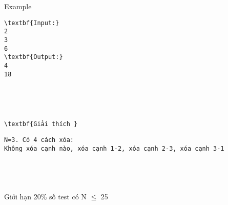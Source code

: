 Example
\begin{verbatim}
\textbf{Input:}
2
3
6
\textbf{Output:}  
4
18\end{verbatim}

 

 
\begin{verbatim}
\textbf{Giải thích }\end{verbatim}
\begin{verbatim}
N=3. Có 4 cách xóa:
Không xóa cạnh nào, xóa cạnh 1-2, xóa cạnh 2-3, xóa cạnh 3-1 \end{verbatim}
\begin{verbatim}
 \end{verbatim}
\begin{verbatim}
 \end{verbatim}
Giới hạn
20\% số test có N  $\le$  25